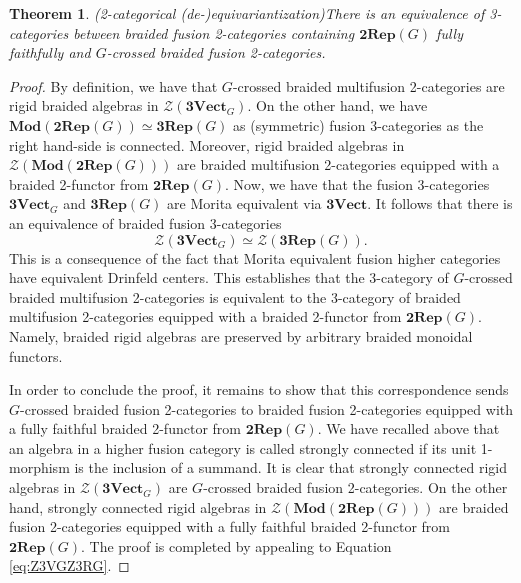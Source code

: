 \documentclass[10pt,a4paper]{amsart}
\theoremstyle{plain}
\newtheorem{thm}{Theorem}
\theoremstyle{definition}
\theoremstyle{remark}
\begin{document}
\begin{thm}{(2-categorical (de-)equivariantization)}\label{thm:deequiv}
There is an equivalence of 3-categories between braided fusion 2-categories containing $\mathbf{2Rep}(G)$ fully faithfully and $G$-crossed braided fusion 2-categories.
\end{thm}

\begin{proof}
By definition, we have that $G$-crossed braided multifusion 2-categories are rigid braided algebras in $\mathcal{Z}(\mathbf{3Vect}_G)$. On the other hand, we have $\mathbf{Mod}(\mathbf{2Rep}(G))\simeq \mathbf{3Rep}(G)$ as (symmetric) fusion 3-categories as the right hand-side is connected. Moreover, rigid braided algebras in $\mathcal{Z}(\mathbf{Mod}(\mathbf{2Rep}(G)))$ are braided multifusion 2-categories equipped with a braided 2-functor from $\mathbf{2Rep}(G)$. Now, we have that the fusion 3-categories $\mathbf{3Vect}_G$ and $\mathbf{3Rep}(G)$ are Morita equivalent via $\mathbf{3Vect}$. It follows that there is an equivalence of braided fusion 3-categories
\begin{equation}\label{eq:Z3VGZ3RG}
\mathcal{Z}(\mathbf{3Vect}_G)\simeq\mathcal{Z}(\mathbf{3Rep}(G)).
\end{equation}
This is a consequence of the fact that Morita equivalent fusion higher categories have equivalent Drinfeld centers.
This establishes that the 3-category of $G$-crossed braided multifusion 2-categories is equivalent to the 3-category of braided multifusion 2-categories equipped with a braided 2-functor from $\mathbf{2Rep}(G)$.
Namely, braided rigid algebras are preserved by arbitrary braided monoidal functors.

In order to conclude the proof, it remains to show that this correspondence sends $G$-crossed braided fusion 2-categories to braided fusion 2-categories equipped with a fully faithful braided 2-functor from $\mathbf{2Rep}(G)$. We have recalled above that an algebra in a higher fusion category is called strongly connected if its unit 1-morphism is the inclusion of a summand. It is clear that strongly connected rigid algebras in $\mathcal{Z}(\mathbf{3Vect}_G)$ are $G$-crossed braided fusion 2-categories. On the other hand, strongly connected rigid algebras in $\mathcal{Z}(\mathbf{Mod}(\mathbf{2Rep}(G)))$ are braided fusion 2-categories equipped with a fully faithful braided 2-functor from $\mathbf{2Rep}(G)$. The proof is completed by appealing to Equation \eqref{eq:Z3VGZ3RG}.
\end{proof}
\end{document}
